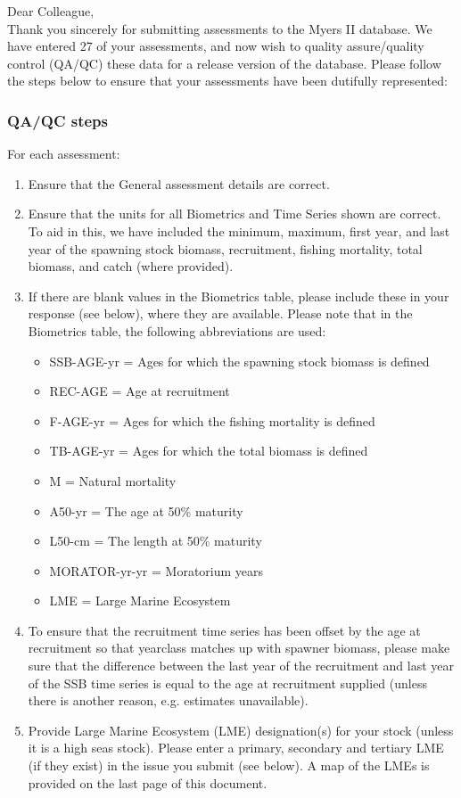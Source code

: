 \documentclass [a4paper, 10pt] {article}
\begin{document}
\noindent Dear Colleague,\\

\noindent Thank you sincerely for submitting assessments to the Myers II database. We have entered 27 of your assessments, and now wish to quality assure/quality control (QA/QC) these data for a release version of the database. Please follow the steps below to ensure that your assessments have been dutifully represented:
\subsubsection{QA/QC steps}
For each assessment:
\begin{enumerate}
\item Ensure that the General assessment details are correct.
\item Ensure that the units for all Biometrics and Time Series shown are correct. To aid in this, we have included the minimum, maximum, first year, and last year of the spawning stock biomass, recruitment, fishing mortality, total biomass, and  catch  (where provided). 
\item If there are blank values in the Biometrics table, please include these in your response (see below), where they are available.
Please note that in the Biometrics table, the following abbreviations are used:
\begin{itemize}
\item SSB-AGE-yr  = Ages for which the spawning stock biomass is defined
\item REC-AGE     = Age at recruitment
\item F-AGE-yr    = Ages for which the fishing mortality is defined 
\item TB-AGE-yr   = Ages for which the total biomass is defined
\item M      = Natural mortality
\item A50-yr      = The age at 50\% maturity
\item L50-cm      = The length at 50\% maturity
\item MORATOR-yr-yr = Moratorium years
\item LME = Large Marine Ecosystem\\
\end{itemize}
\item To ensure that the recruitment time series has been offset by the age at recruitment so that yearclass matches up with spawner biomass, please make sure that the difference between the last year of the recruitment and last year of the SSB time series is equal to the age at recruitment supplied (unless there is another reason, e.g. estimates unavailable). 
\item Provide Large Marine Ecosystem (LME) designation(s) for your stock (unless it is a high seas stock). Please enter a primary, secondary and tertiary LME (if they exist) in the issue you submit (see below). A map of the LMEs is provided on the last page of this document. 
\end{enumerate}
\vspace{-.25in}
\end{document}
